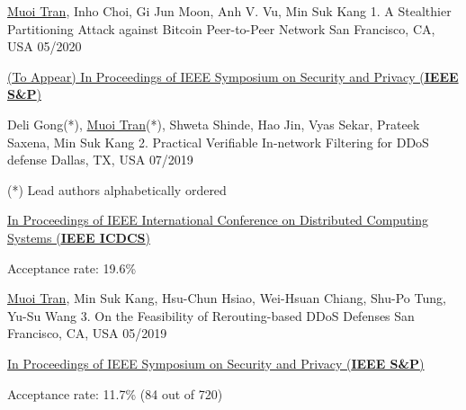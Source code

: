 


\begin{cventries}

  \cventry
    {\underline{Muoi Tran}, Inho Choi, Gi Jun Moon, Anh V. Vu, Min Suk Kang} %
    {1. A Stealthier Partitioning Attack against Bitcoin Peer-to-Peer Network} %
    {San Francisco, CA, USA} %
    {05/2020} %
    {
      \begin{cvitems} %
        \item {\href{https://www.ieee-security.org/TC/SP2020/}{(To Appear) In Proceedings of IEEE Symposium on Security and Privacy (\textbf{IEEE S\&P})}}
      \end{cvitems}
    }

  \cventry
    {Deli Gong(*), \underline{Muoi Tran}(*), Shweta Shinde, Hao Jin, Vyas Sekar, Prateek Saxena, Min Suk Kang} %
    {2. Practical Verifiable In-network Filtering for DDoS defense} %
    {Dallas, TX, USA}
    {07/2019}
    {
      \begin{cvitems} %
        \item {(*) Lead authors alphabetically ordered}
        \item {\href{https://theory.utdallas.edu/ICDCS2019/}{In Proceedings of IEEE International Conference on Distributed Computing Systems (\textbf{IEEE ICDCS})}}
        \item {Acceptance rate: 19.6\%}
      \end{cvitems}
    }

  \cventry
    {\underline{Muoi Tran}, Min Suk Kang, Hsu-Chun Hsiao, Wei-Hsuan Chiang, Shu-Po Tung, Yu-Su Wang} %
    {3. On the Feasibility of Rerouting-based DDoS Defenses } %
    {San Francisco, CA, USA} %
    {05/2019} %
    {
      \begin{cvitems} %
        \item {\href{https://www.ieee-security.org/TC/SP2019/}{In Proceedings of IEEE Symposium on Security and Privacy (\textbf{IEEE S\&P})}}
        \item {Acceptance rate: 11.7\% (84 out of 720) }
      \end{cvitems}
    }


\end{cventries}
